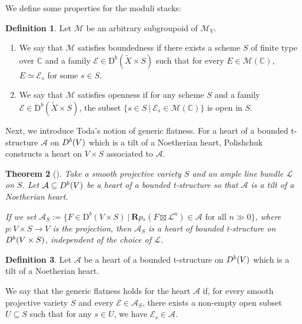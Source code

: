 \documentclass[12pt]{amsart}
\newtheorem{theorem}{Theorem}[section]
\theoremstyle{definition}
\newtheorem{definition}[theorem]{Definition}
\begin{document}
We define some properties for the moduli stacks:
\begin{definition}
    

Let $\mathcal{M}$ be an arbitrary subgroupoid of $\mathcal{M}_V$.
\begin{enumerate}
    \item[(1)] We say that $\mathcal{M}$ satisfies boundedness if there exists a scheme $S$ of finite type over $\mathbb{C}$ and a family $\mathcal{E} \in \mathrm{D}^b(\widetilde{X} \times S)$ such that for every $E \in \mathcal{M}(\mathbb{C})$,
    $E \simeq \mathcal{E}_s$ for some $s \in S$. 
    \item[(2)] We say that $\mathcal{M}$ satisfies openness if for any scheme $S$ and a family $\mathcal{E} \in \mathrm{D}^b(\widetilde{X} \times S)$, the subset $\{ s\in S \ | \ \mathcal{E}_s \in \mathcal{M}(\mathbb{C}) \} $ is open in $S$.
\end{enumerate}
\end{definition}



Next, we introduce Toda's notion of generic flatness.
For a heart of a bounded t-structure $\mathcal{A}$ on ${\rm D}^b(V)$ which is a tilt of a Noetherian heart,
Polishchuk constructs a heart on $V\times S$ associated to $\mathcal{A}$.

\begin{theorem}[{\normalfont\cite[Theorem 3.3.6]{Pol07}}]\label{Pol07}
Take a smooth projective variety $S$ and an ample line bundle $\mathcal{L}$ on $S$.
Let $\mathcal{A}\subseteq {\rm D}^b(V)$ be a  heart of a bounded t-structure so that $\mathcal{A}$ is a tilt of a Noetherian heart. 

If we set $\mathcal{A}_S:= \{F \in \mathrm{D}^b(V \times S) \ |\ \mathbf{R}p_\ast (F \boxtimes \mathcal{L}^n) \in \mathcal{A} \text{ for all } n \gg 0\}$,
where $p \colon V\times S \longrightarrow V$ is the projection,
then $\mathcal{A}_S$ is a heart of bounded t-structure on ${\rm D}^b(V\times S)$, independent of the choice of $\mathcal{L}$.
\end{theorem}

\begin{definition}
Let $\mathcal{A}$ be a heart of a bounded t-structure on ${\rm D}^b(V)$ which is a tilt of a Noetherian heart.

We say that the generic flatness holds for the heart $\mathcal{A}$ if, for every smooth projective variety $S$ and every $\mathcal{E}\in \mathcal{A}_S$, there exists a non-empty open subset $U\subseteq S$ such that for any $s \in U$, we have $\mathcal{E}_s \in \mathcal{A}$.
\end{definition}
\end{document}
